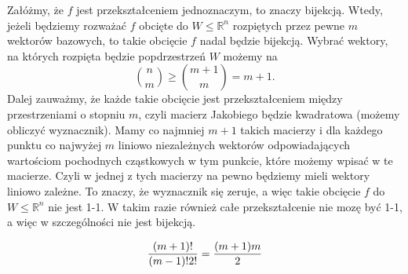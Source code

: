 \documentclass{article}[13pt]
\newcommand{\R}{\mathds{R}}
\begin{document}
\newpage

Załóżmy, że $f$ jest przekształceniem jednoznaczym, to znaczy bijekcją. Wtedy, jeżeli będziemy rozważać $f$ obcięte do $W\leq\R^n$ rozpiętych przez pewne $m$ wektorów bazowych, to takie obcięcie $f$ nadal będzie bijekcją. Wybrać wektory, na których rozpięta będzie popdrzestrzeń $W$ możemy na
$${n\choose m}\geq {m+1\choose m}=m+1.$$
Dalej zauważmy, że każde takie obcięcie jest przekształceniem między przestrzeniami o stopniu $m$, czyli macierz Jakobiego będzie kwadratowa (możemy obliczyć wyznacznik). Mamy co najmniej $m+1$ takich macierzy i dla każdego punktu co najwyżej $m$ liniowo niezależnych wektorów odpowiadających wartościom pochodnych cząstkowych w tym punkcie, które możemy wpisać w te macierze. Czyli w jednej z tych macierzy na pewno będziemy mieli wektory liniowo zależne. To znaczy, że wyznacznik się zeruje, a więc takie obcięcie $f$ do $W\leq\R^n$ nie jest 1-1. W takim razie również całe przekształcenie nie mozę być 1-1, a więc w szczególności nie jest bijekcją.

$${(m+1)!\over(m-1)!2!}={(m+1)m\over 2}$$
\end{document}
